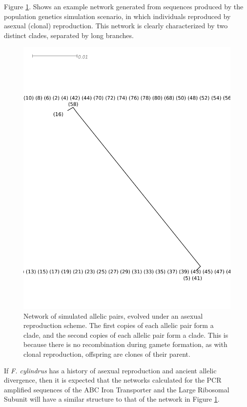 Figure \ref{fig:asexnet}. Shows an example network generated from sequences produced by the population genetics simulation scenario, in which individuals reproduced by asexual (clonal) reproduction.
This network is clearly characterized by two distinct clades, separated by long branches.

\begin{figure}
\centering
\includegraphics[width=\textwidth,keepaspectratio]{Figures/Fcylindrus/Asexual_randomSub}
\caption{Network of simulated allelic pairs, evolved under an asexual reproduction scheme.
The first copies of each allelic pair form a clade, and the second copies of each allelic pair form a clade.
This is because there is no recombination during gamete formation, as with clonal reproduction, offspring are clones of their parent.\label{fig:asexnet}}
\end{figure}

If \textit{F. cylindrus} has a history of asexual reproduction and ancient allelic divergence, then it is expected that the networks calculated for the PCR amplified sequences of the ABC Iron Transporter and the Large Ribosomal Subunit will have a similar structure to that of the network in Figure \ref{fig:asexnet}.

